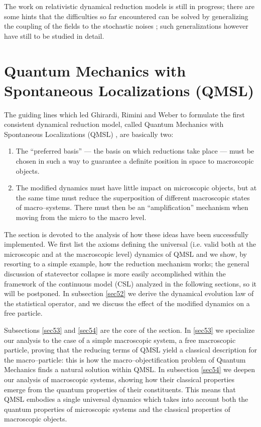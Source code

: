 \documentclass[12pt]{article}
\begin{document}
The work on relativistic dynamical reduction models is still in
progress; there are some hints that the difficulties so far
encountered can be solved by generalizing the coupling of the
fields to the stochastic noises \cite{ppo1, ppo2, bgrel}; such
generalizations however have still to be studied in detail.



\section{Quantum Mechanics with Spontaneous Localizations (QMSL)}
\label{sec5}

 The guiding lines which led Ghirardi, Rimini and
Weber to formulate the first consistent dynamical reduction model,
called Quantum Mechanics with Spontaneous Localizations (QMSL)
\cite{heid, grw}, are basically two:
\begin{enumerate}
\item The ``preferred basis'' --- the basis on which
reductions take place --- must be chosen in such a way to guarantee a
definite position in space to macroscopic objects.
\item The modified dynamics must have little impact on microscopic
objects, but at the same time must reduce the superposition of
different macroscopic states of macro--systems. There must then be
an ``amplification'' mechanism when moving from the micro to the
macro level.
\end{enumerate}
The section is devoted to the analysis of how these ideas have
been successfully implemented. We first list the axioms defining
the universal (i.e. valid both at the microscopic and at the
macroscopic level) dynamics of QMSL and we show, by resorting to a
simple example, how the reduction mechanism works; the general
discussion of statevector collapse is more easily accomplished
within the framework of the continuous model (CSL) analyzed in the
following sections, so it will be postponed. In subsection
\ref{sec52} we derive the dynamical evolution law of the
statistical operator, and we discuss the effect of the modified
dynamics on a free particle.

Subsections \ref{sec53} and \ref{sec54} are the core of the
section. In \ref{sec53} we specialize our analysis to the case of
a simple macroscopic system, a free macroscopic particle, proving
that the reducing terms of QMSL yield a classical description for
the macro--particle: this is how the macro--objectification
problem of Quantum Mechanics finds a natural solution within QMSL.
In subsection \ref{sec54} we deepen our analysis of macroscopic
systems, showing how their classical properties emerge from the
quantum properties of their constituents. This means that QMSL
embodies a single universal dynamics which takes into account both
the quantum properties of microscopic systems and the classical
properties of macroscopic objects.
\end{document}
